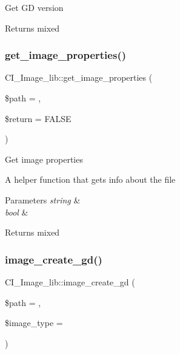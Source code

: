 Get GD version

\begin{DoxyReturn}{Returns}
mixed 
\end{DoxyReturn}
\mbox{\label{class_c_i___image__lib_ab4f28854278fb99ba613f00e155fdc63}} 
\subsubsection{\texorpdfstring{get\+\_\+image\+\_\+properties()}{get\_image\_properties()}}
{\footnotesize\ttfamily C\+I\+\_\+\+Image\+\_\+lib\+::get\+\_\+image\+\_\+properties (\begin{DoxyParamCaption}\item[{}]{\$path = {\ttfamily \textquotesingle{}\textquotesingle{}},  }\item[{}]{\$return = {\ttfamily FALSE} }\end{DoxyParamCaption})}

Get image properties

A helper function that gets info about the file


\begin{DoxyParams}{Parameters}
{\em string} & \\
\hline
{\em bool} & \\
\hline
\end{DoxyParams}
\begin{DoxyReturn}{Returns}
mixed 
\end{DoxyReturn}
\mbox{\label{class_c_i___image__lib_a1e7d7081c922ac25ed9c8dbb8eaa5c36}} 
\subsubsection{\texorpdfstring{image\+\_\+create\+\_\+gd()}{image\_create\_gd()}}
{\footnotesize\ttfamily C\+I\+\_\+\+Image\+\_\+lib\+::image\+\_\+create\+\_\+gd (\begin{DoxyParamCaption}\item[{}]{\$path = {\ttfamily \textquotesingle{}\textquotesingle{}},  }\item[{}]{\$image\+\_\+type = {\ttfamily \textquotesingle{}\textquotesingle{}} }\end{DoxyParamCaption})}

